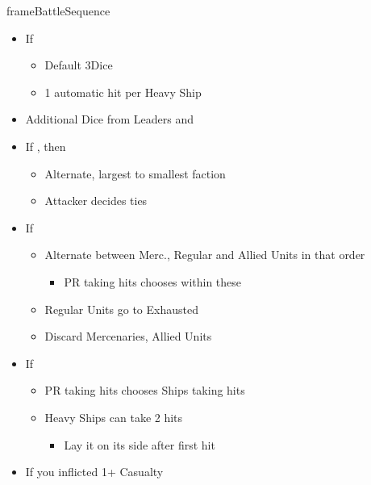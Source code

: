 \documentclass[10pt]{article}
\newlength{\fhBattleSequence} \setlength\fhBattleSequence{31\baselineskip}
\begin{document}
\begin{dynamiccontents*}{frameBattleSequence}
\begin{eubox}{\fhBattleSequence}
\begin{multicols}{3}
\begin{itemize}
\begin{itemize}
\begin{itemize}
				\end{itemize}
			\end{itemize}
			\item If 
			\begin{itemize}
				\item Default 3\artillery Dice
				\item 1 automatic hit per Heavy Ship 
			\end{itemize}
			\item Additional Dice from Leaders and \battleactions
		\end{itemize}
		\begin{itemize}
			\item If , then
			\begin{itemize}
				\item Alternate, largest to smallest faction
				\item Attacker decides ties
			\end{itemize}
			\item If 
			\begin{itemize}
				\item Alternate between Merc., Regular and Allied Units in that order
				\begin{itemize}
					\item PR taking hits chooses within these
				\end{itemize}
				\item Regular Units go to Exhausted \manpower
				\item Discard Mercenaries, Allied Units
			\end{itemize}
			\item If 
			\begin{itemize}
				\item PR taking hits chooses Ships taking hits
				\item Heavy Ships can take 2 hits
				\begin{itemize}
					\item Lay it on its side after first hit
				\end{itemize}
			\end{itemize}
		\end{itemize}
		\begin{itemize}
			\item If you inflicted 1+ Casualty
			\begin{itemize}

\end{itemize}
\end{itemize}
\end{multicols}
\end{eubox}
\end{dynamiccontents*}
\end{document}
